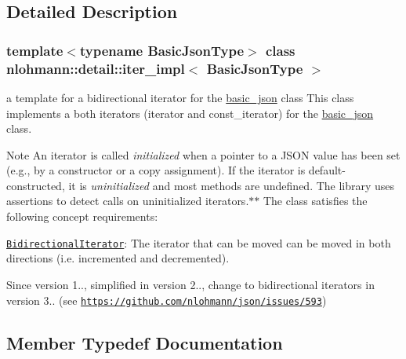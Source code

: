 \subsection{Detailed Description}
\subsubsection*{template$<$typename Basic\+Json\+Type$>$\newline
class nlohmann\+::detail\+::iter\+\_\+impl$<$ Basic\+Json\+Type $>$}

a template for a bidirectional iterator for the \hyperlink{classnlohmann_1_1basic__json}{basic\+\_\+json} class This class implements a both iterators (iterator and const\+\_\+iterator) for the \hyperlink{classnlohmann_1_1basic__json}{basic\+\_\+json} class. 

\begin{DoxyNote}{Note}
An iterator is called {\itshape initialized} when a pointer to a J\+S\+ON value has been set (e.\+g., by a constructor or a copy assignment). If the iterator is default-\/constructed, it is {\itshape uninitialized} and most methods are undefined. The library uses assertions to detect calls on uninitialized iterators.$\ast$$\ast$  The class satisfies the following concept requirements\+:
\begin{DoxyItemize}
\item \href{https://en.cppreference.com/w/cpp/named_req/BidirectionalIterator}{\tt Bidirectional\+Iterator}\+: The iterator that can be moved can be moved in both directions (i.\+e. incremented and decremented). 
\end{DoxyItemize}
\end{DoxyNote}
\begin{DoxySince}{Since}
version 1.., simplified in version 2.., change to bidirectional iterators in version 3.. (see \href{https://github.com/nlohmann/json/issues/593}{\tt https\+://github.\+com/nlohmann/json/issues/593}) 
\end{DoxySince}


\subsection{Member Typedef Documentation}
\mbox{\label{classnlohmann_1_1detail_1_1iter__impl_ad9e091f5c70b34b5b1abc1ab15fd9106}} 
